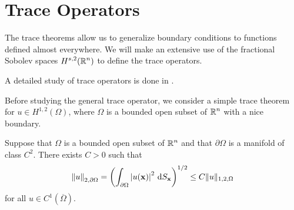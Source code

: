 \section{Trace Operators} \label{sectTraceOp}

The trace theorems allow us to generalize boundary conditions to
functions defined almost everywhere.  We will make an extensive use of
the fractional Sobolev spaces $\displaystyle H^{s,2}(\mathbb{R}^n)$ to define
the trace operators.

A detailed study of trace operators is done in \cite{LiMa1}.

Before studying the general trace operator, we consider a simple trace
theorem for $\displaystyle u \in H^{1,2}(\Omega)$, where $\Omega$ is a
bounded open subset of $\displaystyle \mathbb{R}^n$ with a nice boundary.

\begin{prop}
Suppose that $\Omega$ is a bounded open subset of $\displaystyle \mathbb{R}^n$ and that
$\partial \Omega$ is a manifold of class $\displaystyle C^2$.  There
exists $C>0$ such that
\[
\left\| u \right\|_{2,\partial \Omega}
= \left( \int_{\partial \Omega} \left|u(\mathbf{x})\right|^2
\,\mathrm{d}{S}_{\mathbf{x}} \right)^{1/2}
\leq C \| u\|_{1,2,\Omega}
\]
for all $\displaystyle u \in C^1(\overline{\Omega})$.
\end{prop}

